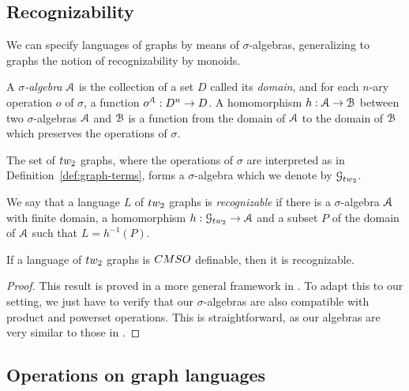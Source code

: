 \subsection{Recognizability}
 We can specify languages of graphs by means of $\sigma$-algebras, generalizing to graphs the notion of recognizability by monoids.  
 
 \begin{definition} A \emph{$\sigma$-algebra} $\mathcal A$ is the collection of a set $D$ called its \emph{domain}, and for each $n$-ary operation  $o$ of $\sigma$, a function $o^\mathcal A:D^n\to D$.
 A homomorphism $h:\mathcal A\to \mathcal B$ between two $\sigma$-algebras $\mathcal A$ and $\mathcal B$ is a function from the domain of $\mathcal A$ to the domain of $\mathcal B$  which preserves the operations of $\sigma$. 
\end{definition} 

  \begin{definition} The set of $\TWT$ graphs, where the operations of $\sigma$ are interpreted as in Definition~\ref{def:graph-terms}, forms a $\sigma$-algebra which we denote by $\G_\TWT$.
  \end{definition}

\begin{definition}[Recognizability]
 We say that a language $L$ of $\TWT$ graphs is \emph{recognizable} if there is a $\sigma$-algebra $\mathcal A$ with finite domain, a homomorphism $h:\G_\TWT\to \A$ and a subset $P$ of the domain of $\mathcal A$ such that $L=h^{-1}(P)$.
\end{definition}

\begin{theorem}\label{thm:CMSO->Rec}
If a language of $\TWT$ graphs is $\CMSO$ definable, then it is recognizable.
\end{theorem}

\begin{proof} 
This result is proved in a more general framework in \cite{Mikolaj-long}. To adapt this to our setting, we just have to verify that our $\sigma$-algebras are also compatible with product and powerset operations. This is straightforward, as our algebras are very similar to those in \cite{Mikolaj-long}.
\end{proof}

\subsection{Operations on graph languages}\label{sec:op-lang}

